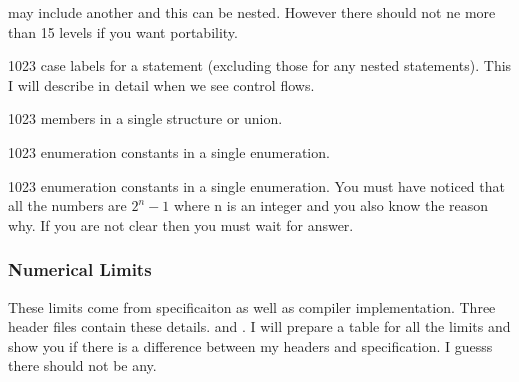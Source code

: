   may include another and this can be nested. However there should not
  ne more than 15 levels if you want portability.
\item 1023 case labels for a  statement (excluding those
  for any nested  statements). This I will describe in
  detail when we see control flows.
\item 1023 members in a single structure or union.
\item 1023 enumeration constants in a single enumeration.
\item 1023 enumeration constants in a single enumeration.
\stopitemize
You must have noticed that all the numbers are $2^n - 1$ where n is an
integer and you also know the reason why. If you are not clear then
you must wait for answer.

\subsubsection{Numerical Limits}
These limits come from specificaiton as well as compiler
implementation. Three header files contain these
details.  and . I will prepare
a table for all the limits and show you if there is a difference
between my headers and specification. I guesss there should not be any.
